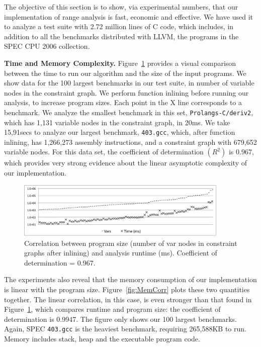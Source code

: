 \documentclass[times]{speauth}
\begin{document}
The objective of this section is to show, via experimental numbers, that our
implementation of range analysis is fast, economic and effective.
We have used it to analyze a test suite with 2.72 million lines of C code,
which includes, in addition to all the benchmarks distributed with LLVM,
the programs in the SPEC CPU 2006 collection.

\noindent
\textbf{Time and Memory Complexity.}
Figure~\ref{fig:TimeCorr} provides a visual comparison between the time to
run our algorithm and the size of the input programs.
We show data for the 100 largest benchmarks in our test suite, in number
of variable nodes in the constraint graph.
We perform function inlining before running our analysis, to increase program
sizes.
Each point in the X line corresponds to a benchmark.
We analyze the smallest benchmark in this set, \texttt{Prolangs-C/deriv2}, which
has 1,131 variable nodes in the constraint graph, in 20ms.
We take 15,91secs to analyze our largest benchmark, \texttt{403.gcc}, which,
after function inlining, has 1,266,273 assembly instructions, and a
constraint graph with 679,652 variable nodes.
For this data set, the coefficient of determination $(R^2)$ is 0.967, which
provides very strong evidence about the linear asymptotic complexity of our
implementation.

\begin{figure}[t!]
\begin{center}
\includegraphics[width=0.9\textwidth]{images/TimeCorr}
\end{center}
\caption{\label{fig:TimeCorr}
Correlation between program size (number of var nodes in constraint
graphs after inlining) and analysis runtime (ms).
Coefficient of determination = 0.967.
}
\end{figure}

The experiments also reveal that the memory consumption of our implementation
is linear with the program size.
Figure~\ref{fig:MemCorr} plots these two quantities together.
The linear correlation, in this case, is even stronger than that found in
Figure~\ref{fig:TimeCorr}, which compares runtime and program size: the
coefficient of determination is 0.9947.
The figure only shows our 100 largest benchmarks.
Again, SPEC \texttt{403.gcc} is the heaviest benchmark, requiring
265,588KB to run.
Memory includes stack, heap and the executable program code.
\end{document}
